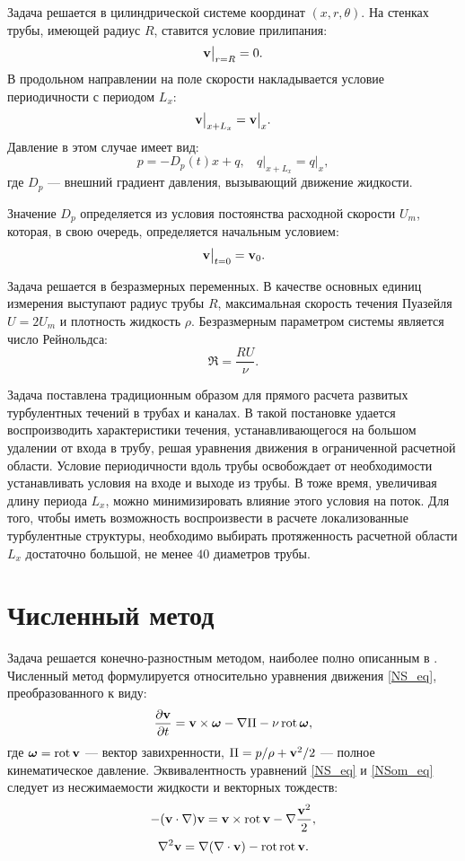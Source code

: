 Задача решается в цилиндрической системе координат $(x,r,\theta)$. На стенках трубы, имеющей радиус $R$, ставится условие прилипания:
\begin{equation} \label{bc1_eq}
\mathbf{v} \big|_{r=R} = 0.
\end{equation}
В продольном направлении на поле скорости накладывается условие периодичности с периодом $L_x$:
\begin{equation} \label{bc2_eq}
\mathbf{v} \big|_{x+L_x} = \mathbf{v} \big|_{x}.
\end{equation}
Давление в этом случае имеет вид:
$$
p = - D_p(t)x + q, \ \ \ \  q\big|_{x+L_x} = q\big|_{x},
$$
где $D_p$ --- внешний градиент давления, вызывающий движение жидкости. 

Значение $D_p$ определяется из условия постоянства расходной скорости $U_m$, которая, в свою очередь, определяется начальным условием:
$$
\mathbf{v}\big|_{t=0} = \mathbf{v}_0.
$$

 
Задача решается в безразмерных переменных. В качестве основных единиц измерения выступают радиус трубы $R$, максимальная скорость течения Пуазейля $U = 2U_m$ и плотность жидкость $\rho$. Безразмерным параметром системы является число Рейнольдса:
$$
\Re = \frac{R U}{\nu}. 
$$

Задача поставлена традиционным образом для прямого расчета развитых турбулентных течений в трубах и каналах. В такой постановке удается воспроизводить характеристики течения, устанавливающегося на большом удалении от входа в трубу, решая уравнения движения в ограниченной расчетной области. Условие периодичности вдоль трубы освобождает от необходимости устанавливать условия на входе и выходе из трубы. В тоже время, увеличивая длину периода $L_x$, можно минимизировать влияние этого условия на поток. Для того, чтобы иметь возможность воспроизвести в расчете локализованные турбулентные структуры, необходимо выбирать протяженность расчетной области $L_x$ достаточно большой, не менее $40$ диаметров трубы. 

\section{Численный метод} \label{num_method}

Задача решается конечно-разностным методом, наиболее полно описанным в \cite{Nikitin2006}. Численный метод формулируется относительно уравнения движения \eqref{NS_eq}, преобразованного к	 виду:
\begin{equation}\label{NSom_eq}
\frac{\partial \mathbf{v}}{\partial t} =  \mathbf{v} \times \mbox{\boldmath$\omega$}  - \nabla \Pi - \nu \mathop{}\!\operatorname{rot} \mbox{\boldmath$\omega$},
\end{equation}
где $\mbox{\boldmath$\omega$} = \mathop{}\!\operatorname{rot} \mathbf{v}$ --- вектор завихренности, $\Pi = p/\rho + \mathbf{v}^2/2$ --- полное кинематическое давление. Эквивалентность уравнений \eqref{NS_eq} и \eqref{NSom_eq} следует из несжимаемости жидкости и векторных тождеств:
\begin{equation*}
-(\mathbf{v} \cdot \nabla) \mathbf{v} = \mathbf{v} \times \mathop{}\!\operatorname{rot} \mathbf{v} - \nabla \frac{\mathbf{v}^2}{2},
\end{equation*}
\begin{equation*}
\nabla^2 \mathbf{v} = \nabla (\nabla \cdot \mathbf{v}) - \mathop{}\!\operatorname{rot} \mathop{}\!\operatorname{rot} \mathbf{v}.
\end{equation*}

